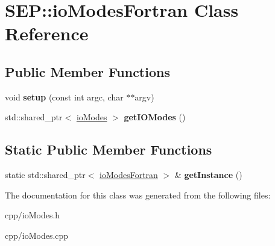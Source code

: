 \hypertarget{class_s_e_p_1_1io_modes_fortran}{}\section{S\+EP\+:\+:io\+Modes\+Fortran Class Reference}
\label{class_s_e_p_1_1io_modes_fortran}
\subsection*{Public Member Functions}
\begin{DoxyCompactItemize}
\item 
\mbox{\label{class_s_e_p_1_1io_modes_fortran_a36a23b7f860c607f497d42c9bcbaff75}} 
void {\bfseries setup} (const int argc, char $\ast$$\ast$argv)
\item 
\mbox{\label{class_s_e_p_1_1io_modes_fortran_a41d4ae4ee48a40e23df8e5825b34e52e}} 
std\+::shared\+\_\+ptr$<$ \hyperlink{class_s_e_p_1_1io_modes}{io\+Modes} $>$ {\bfseries get\+I\+O\+Modes} ()
\end{DoxyCompactItemize}
\subsection*{Static Public Member Functions}
\begin{DoxyCompactItemize}
\item 
\mbox{\label{class_s_e_p_1_1io_modes_fortran_a5f982aaa09099f5840fea20de68603cd}} 
static std\+::shared\+\_\+ptr$<$ \hyperlink{class_s_e_p_1_1io_modes_fortran}{io\+Modes\+Fortran} $>$ \& {\bfseries get\+Instance} ()
\end{DoxyCompactItemize}


The documentation for this class was generated from the following files\+:\begin{DoxyCompactItemize}
\item 
cpp/io\+Modes.\+h\item 
cpp/io\+Modes.\+cpp\end{DoxyCompactItemize}
